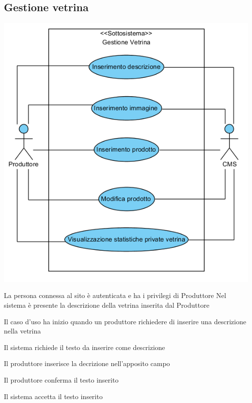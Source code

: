 \subsection{Gestione vetrina}
\begin{center}
   \includegraphics[width=\textwidth]{assets/visualParadigm/GestioneVentrina}
\end{center}
%
{}
{La persona connessa al sito è autenticata e ha i privilegi di Produttore}
{Nel sistema è presente la descrizione della vetrina inserita dal Produttore}
{\begin{enumCU}
		\item Il caso d'uso ha inizio quando un produttore richiedere di inserire una descrizione nella vetrina
		\item Il sistema richiede il testo da inserire come descrizione \label{cuinsdescr:2}
		\item Il produttore inserisce la decrizione nell'apposito campo \label{cuinsdescr:3}
		\item Il produttore conferma il testo inserito
		\item Il sistema accetta il testo inserito
	\end{enumCU}}
